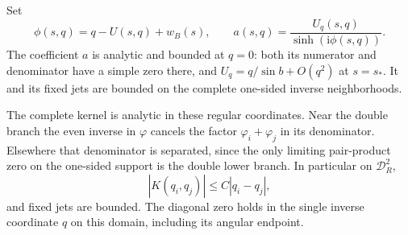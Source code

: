 \documentclass[11pt]{article}
\numberwithin{equation}{section}
\theoremstyle{remark}\newtheorem{remark}[theorem]{Remark}
\newcommand{\ii}{\mathrm i}
\begin{document}
Set
\[
 \phi(s,q)=q-U(s,q)+w_B(s),\qquad
 a(s,q)=\frac{U_q(s,q)}{\sinh(\ii\phi(s,q))}.
\]
The coefficient $a$ is analytic and bounded at $q=0$: both its numerator
and denominator have a simple zero there, and
$U_q=q/\sin b+O(q^2)$ at $s=s_*$. It and its fixed jets are bounded
on the complete one-sided inverse neighborhoods.

The complete kernel is analytic in these regular coordinates. Near
the double branch the even inverse in $\varphi$ cancels the factor
$\varphi_i+\varphi_j$ in its denominator. Elsewhere that denominator
is separated, since the only limiting pair-product zero on the
one-sided support is the double lower branch. In particular on
$\mathcal D_R^2$,
\begin{equation}\label{eq:q-3}
|K(q_i,q_j)|\le C|q_i-q_j|,
\end{equation}
and fixed jets are bounded. The diagonal zero holds in the single inverse coordinate $q$ on
this domain, including its angular endpoint.
\end{document}
